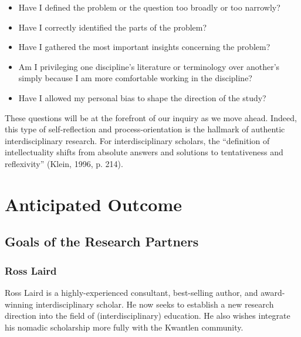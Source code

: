 \documentclass[letterpaper,10pt,headsepline]{scrreprt}
\begin{document}
  \begin{itemize}
    \item Have I deﬁned the problem or the question too broadly or too
      narrowly?
    \item Have I correctly identiﬁed the parts of the problem?
    \item Have I gathered the most important insights concerning the problem?
    \item Am I privileging one discipline's literature or terminology over another's simply
      because I am more comfortable working in the discipline?
    \item Have I allowed my personal bias to shape the direction of the study?
      \end{itemize}

      These questions will be at the forefront of our inquiry as we move
      ahead. Indeed, this type of self-reflection and process-orientation is
      the hallmark of authentic interdisciplinary research. For
      interdisciplinary scholars, the ``definition of intellectuality shifts
      from absolute answers and solutions to tentativeness and reflexivity''
      (Klein, 1996, p. 214).

\section{Anticipated Outcome}

\subsection{Goals of the Research Partners}

\subsubsection{Ross Laird}

Ross Laird is a highly-experienced consultant, best-selling author, and
award-winning interdisciplinary scholar. He now seeks to establish a new
research direction into the field of (interdisciplinary) education. He also
wishes integrate his nomadic scholarship more fully with the Kwantlen
community.
\end{document}
